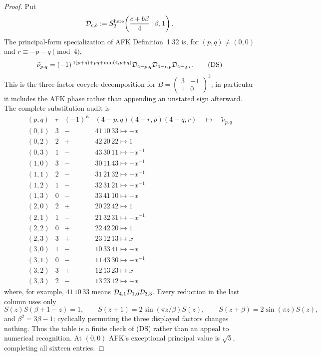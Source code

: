 \documentclass[11pt]{article}
\begin{document}
\begin{proof}
Put
\[
 {\cal D}_{c,b}:=
 S_2^{\mathrm{here}}\!\left(\frac{c+b\beta}{4}\,\middle|\,\beta,1\right).
\]
The principal-form specialization of AFK Definition~1.32 is, for
$(p,q)\ne(0,0)$ and $r\equiv-p-q\pmod4$,
\[
 \widetilde\nu_{p,q}
 =(-1)^{\,4(p+q)+pq+\min(4,p+q)}
 {\cal D}_{4-p,q}{\cal D}_{4-r,p}{\cal D}_{4-q,r}.
\tag{DS}
\]
This is the three-factor cocycle decomposition for
$B=\left(\begin{smallmatrix}3&-1\\1&0\end{smallmatrix}\right)^3$;
in particular it includes the AFK phase rather than appending an
unstated sign afterward.  The complete substitution audit is
\[
\begin{array}{c|c|c|c}
(p,q)&r&(-1)^E&
({4-p,q})({4-r,p})({4-q,r})\quad\longmapsto\quad
\widetilde\nu_{p,q}\\ \hline
(0,1)&3&-&41\,10\,33\mapsto-x\\
(0,2)&2&+&42\,20\,22\mapsto1\\
(0,3)&1&-&43\,30\,11\mapsto-x^{-1}\\
(1,0)&3&-&30\,11\,43\mapsto-x^{-1}\\
(1,1)&2&-&31\,21\,32\mapsto-x^{-1}\\
(1,2)&1&-&32\,31\,21\mapsto-x^{-1}\\
(1,3)&0&-&33\,41\,10\mapsto-x\\
(2,0)&2&+&20\,22\,42\mapsto1\\
(2,1)&1&-&21\,32\,31\mapsto-x^{-1}\\
(2,2)&0&+&22\,42\,20\mapsto1\\
(2,3)&3&+&23\,12\,13\mapsto x\\
(3,0)&1&-&10\,33\,41\mapsto-x\\
(3,1)&0&-&11\,43\,30\mapsto-x^{-1}\\
(3,2)&3&+&12\,13\,23\mapsto x\\
(3,3)&2&-&13\,23\,12\mapsto-x
\end{array}
\]
where, for example, $41\,10\,33$ means
${\cal D}_{4,1}{\cal D}_{1,0}{\cal D}_{3,3}$.
Every reduction in the last column uses only
\[
 S(z)S(\beta+1-z)=1,\qquad
 S(z+1)=2\sin(\pi z/\beta)S(z),\qquad
 S(z+\beta)=2\sin(\pi z)S(z),
\tag{FE}
\]
and $\beta^2=3\beta-1$; cyclically permuting the three displayed
factors changes nothing.  Thus the table is a finite check of
\textup{(DS)} rather than an appeal to numerical recognition.
At $(0,0)$ AFK's exceptional principal value is $\sqrt5$, completing
all sixteen entries.
\end{proof}
\end{document}

